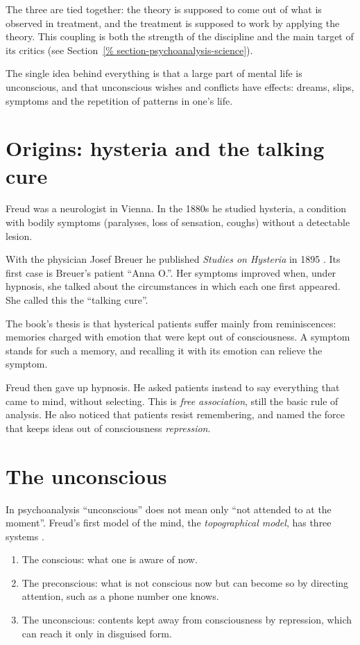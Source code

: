 The three are tied together: the theory
is supposed to come out of what is
observed in treatment, and the treatment
is supposed to work by applying the
theory. This coupling is both the
strength of the discipline and the main
target of its critics (see
Section~\ref{%
section-psychoanalysis-science}).

The single idea behind everything is
that a large part of mental life is
unconscious, and that unconscious
wishes and conflicts have effects:
dreams, slips, symptoms and the
repetition of patterns in one's life.

\section{Origins: hysteria and the
talking cure}
\label{section-psychoanalysis-origins}

Freud was a neurologist in Vienna. In
the 1880s he studied hysteria, a
condition with bodily symptoms
(paralyses, loss of sensation, coughs)
without a detectable lesion.

With the physician Josef Breuer he
published \emph{Studies on Hysteria} in
1895 \cite{freud-se-2-hysteria}. Its
first case is Breuer's patient ``Anna
O.''. Her symptoms improved when, under
hypnosis, she talked about the
circumstances in which each one first
appeared. She called this the ``talking
cure''.

The book's thesis is that hysterical
patients suffer mainly from
reminiscences: memories charged with
emotion that were kept out of
consciousness. A symptom stands for such
a memory, and recalling it with its
emotion can relieve the symptom.

Freud then gave up hypnosis. He asked
patients instead to say everything that
came to mind, without selecting. This
is \emph{free association}, still the
basic rule of analysis. He also noticed
that patients resist remembering, and
named the force that keeps ideas out of
consciousness \emph{repression}.

\section{The unconscious}
\label{section-unconscious}

In psychoanalysis ``unconscious'' does
not mean only ``not attended to at the
moment''. Freud's first model of the
mind, the \emph{topographical model},
has three systems
\cite{freud-se-14-unconscious}.

\begin{enumerate}
\item The conscious: what one is aware
of now.
\item The preconscious: what is not
conscious now but can become so by
directing attention, such as a phone
number one knows.
\item The unconscious: contents kept
away from consciousness by repression,
which can reach it only in disguised
form.
\end{enumerate}

